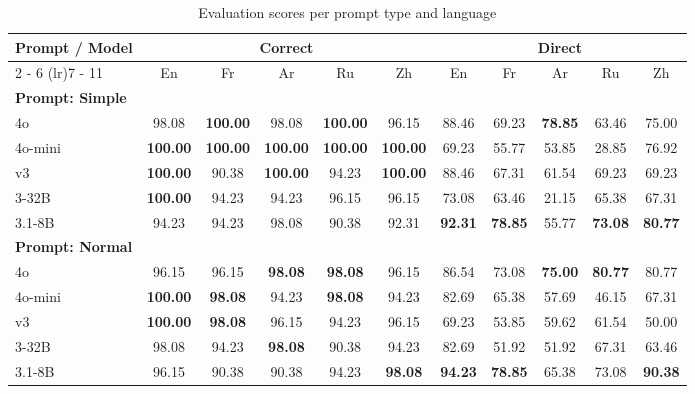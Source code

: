 \documentclass{article}%
\begin{document}
%
\normalsize%


\begin{table}[h!]%
\centering%
\setlength{\tabcolsep}{5pt}%
\begin{tabular}{@{}lcccccccccc@{}}%
\toprule%
\textbf{Prompt / Model} & \multicolumn{5}{c}{\textbf{Correct}} & \multicolumn{5}{c}{\textbf{Direct}}\\%
\cmidrule(lr){2%
-%
6}%
\cmidrule(lr){7%
-%
11}%
&En&Fr&Ar&Ru&Zh&En&Fr&Ar&Ru&Zh\\%
\midrule%
\multicolumn{11}{l}{\textbf{Prompt: Simple}} \\%
\openai{} 4o&98.08&\textbf{100.00}&98.08&\textbf{100.00}&96.15&88.46&69.23&\textbf{78.85}&63.46&75.00\\%
\openai{} 4o-mini&\textbf{100.00}&\textbf{100.00}&\textbf{100.00}&\textbf{100.00}&\textbf{100.00}&69.23&55.77&53.85&28.85&76.92\\%
\deepseek{} v3&\textbf{100.00}&90.38&\textbf{100.00}&94.23&\textbf{100.00}&88.46&67.31&61.54&69.23&69.23\\%
\qwen{} 3-32B&\textbf{100.00}&94.23&94.23&96.15&96.15&73.08&63.46&21.15&65.38&67.31\\%
\meta{} 3.1-8B&94.23&94.23&98.08&90.38&92.31&\textbf{92.31}&\textbf{78.85}&55.77&\textbf{73.08}&\textbf{80.77}\\%
\midrule%
\multicolumn{11}{l}{\textbf{Prompt: Normal}} \\%
\openai{} 4o&96.15&96.15&\textbf{98.08}&\textbf{98.08}&96.15&86.54&73.08&\textbf{75.00}&\textbf{80.77}&80.77\\%
\openai{} 4o-mini&\textbf{100.00}&\textbf{98.08}&94.23&\textbf{98.08}&94.23&82.69&65.38&57.69&46.15&67.31\\%
\deepseek{} v3&\textbf{100.00}&\textbf{98.08}&96.15&94.23&96.15&69.23&53.85&59.62&61.54&50.00\\%
\qwen{} 3-32B&98.08&94.23&\textbf{98.08}&90.38&94.23&82.69&51.92&51.92&67.31&63.46\\%
\meta{} 3.1-8B&96.15&90.38&90.38&94.23&\textbf{98.08}&\textbf{94.23}&\textbf{78.85}&65.38&73.08&\textbf{90.38}\\\bottomrule%
%
\end{tabular}%
\caption{Evaluation scores per prompt type and language}%
\end{table}

%
\end{document}
